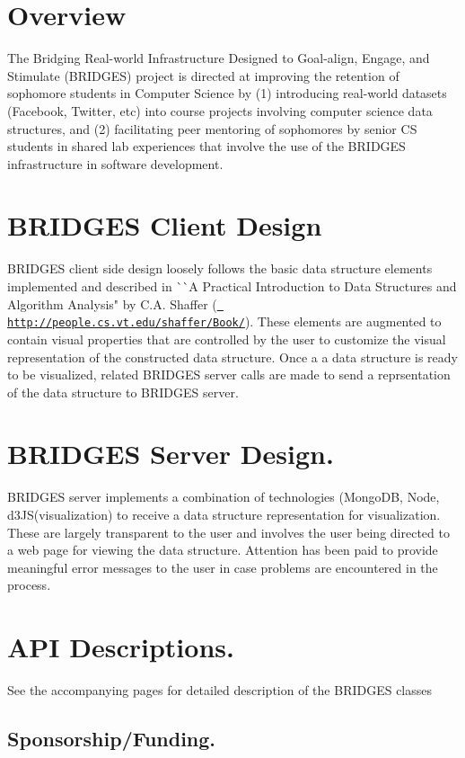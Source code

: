 \hypertarget{index_overview_sec}{}\section{Overview}\label{index_overview_sec}
The Bridging Real-\/world Infrastructure Designed to Goal-\/align, Engage, and Stimulate (B\+R\+I\+D\+G\+ES) project is directed at improving the retention of sophomore students in Computer Science by (1) introducing real-\/world datasets (Facebook, Twitter, etc) into course projects involving computer science data structures, and (2) facilitating peer mentoring of sophomores by senior CS students in shared lab experiences that involve the use of the B\+R\+I\+D\+G\+ES infrastructure in software development. \hypertarget{index_br_client}{}\section{B\+R\+I\+D\+G\+E\+S Client Design}\label{index_br_client}
B\+R\+I\+D\+G\+ES client side design loosely follows the basic data structure elements implemented and described in \`{}\`{}A Practical Introduction to Data Structures and Algorithm Analysis" by C.\+A. Shaffer (\href{http://people.cs.vt.edu/shaffer/Book/}{\texttt{ http\+://people.\+cs.\+vt.\+edu/shaffer/\+Book/}}). These elements are augmented to contain visual properties that are controlled by the user to customize the visual representation of the constructed data structure. Once a a data structure is ready to be visualized, related B\+R\+I\+D\+G\+ES server calls are made to send a reprsentation of the data structure to B\+R\+I\+D\+G\+ES server. \hypertarget{index_br_server}{}\section{B\+R\+I\+D\+G\+E\+S Server Design.}\label{index_br_server}
B\+R\+I\+D\+G\+ES server implements a combination of technologies (Mongo\+DB, Node, d3\+J\+S(visualization) to receive a data structure representation for visualization. These are largely transparent to the user and involves the user being directed to a web page for viewing the data structure. Attention has been paid to provide meaningful error messages to the user in case problems are encountered in the process. \hypertarget{index_api_sec}{}\section{A\+P\+I Descriptions.}\label{index_api_sec}
See the accompanying pages for detailed description of the B\+R\+I\+D\+G\+ES classes \hypertarget{index_sponsor_sec}{}\subsection{Sponsorship/\+Funding.}\label{index_sponsor_sec}
